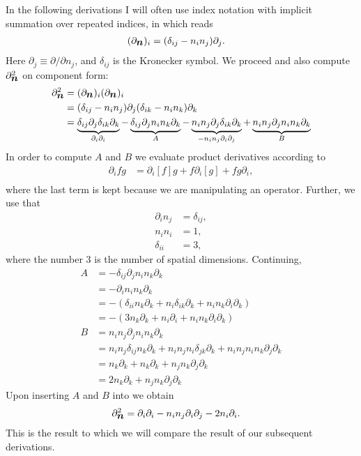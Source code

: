 \documentclass[thesis.tex]{subfiles}
\begin{document}
In the following derivations I will often use index notation with implicit summation over repeated indices, in which  reads
\begin{align*}
	(\partial_{\mbox{\boldmath$n$}})_i &= (\delta_{ij} - n_in_j)\partial_j.
\end{align*}
Here $\partial_j \equiv \partial/\partial n_j$, and $\delta_{ij}$ is the Kronecker symbol. We proceed and also compute $\partial^2_{\mbox{\boldmath$n$}}$ on component form:
\begin{align}
	\partial^2_{\ve n} &= (\partial_{\ve n})_i(\partial_{\ve n})_i \nn \\
	&= (\delta_{ij} - n_in_j)\partial_j(\delta_{ik} - n_in_k)\partial_k \nn \\
	&= \underbrace{\delta_{ij}\partial_j \delta_{ik} \partial_k}_{\partial_i\partial_i} - \underbrace{\delta_{ij}\partial_jn_in_k\partial_k}_{A} - \underbrace{n_in_j\partial_j\delta_{ik}\partial_k}_{-n_in_j\partial_i\partial_j} + \underbrace{n_in_j\partial_jn_in_k\partial_k}_{B}\eqnlab{partialn2start}
\end{align}
In order to compute $A$ and $B$ we evaluate product derivatives according to
\begin{align*}
	\partial_i f g &= \partial_i [f] g + f \partial_i[g] + fg \partial_i, \\
\end{align*}
where the last term is kept because we are manipulating an operator. Further, we use that
\begin{align*}
		\partial_i n_j &= \delta_{ij},\\
		n_in_i &= 1,\\
		\delta_{ii} &= 3,
\end{align*}
where the number $3$ is the number of spatial dimensions. Continuing, 
\begin{align*}
A &= -\delta_{ij}\partial_jn_in_k\partial_k \\
&= -\partial_in_in_k\partial_k \\
&= -(\delta_{ii}n_k\partial_k + n_i \delta_{ik} \partial_k + n_in_k\partial_i\partial_k)\\
&= -(3n_k\partial_k + n_i \partial_i + n_in_k\partial_i\partial_k)\\
%
B&=n_in_j\partial_jn_in_k\partial_k \\
	&= n_in_j\delta_{ij}n_k\partial_k + n_in_jn_i\delta_{jk}\partial_k + n_in_jn_in_k\partial_j\partial_k\\
	&=n_k\partial_k + n_k\partial_k + n_jn_k\partial_j\partial_k \\
	&= 2n_k\partial_k + n_jn_k\partial_j\partial_k
\end{align*}
Upon inserting $A$ and $B$ into  we obtain
\begin{align}
	\partial^2_{\ve n} &= \partial_i\partial_i - n_in_j\partial_i\partial_j - 2n_i\partial_i. \eqnlab{partialn2}
\end{align}
This is the result to which we will compare the result of our subsequent derivations.
\end{document}
